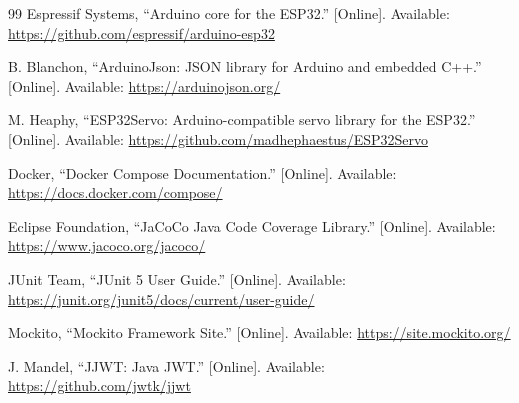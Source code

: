 \begin{thebibliography}{99}
Espressif Systems, ``Arduino core for the ESP32.'' [Online]. Available:
\url{https://github.com/espressif/arduino-esp32}

B. Blanchon, ``ArduinoJson: JSON library for Arduino and embedded C++.'' [Online].
Available: \url{https://arduinojson.org/}

M. Heaphy, ``ESP32Servo: Arduino-compatible servo library for the ESP32.''
[Online]. Available: \url{https://github.com/madhephaestus/ESP32Servo}

Docker, ``Docker Compose Documentation.'' [Online]. Available:
\url{https://docs.docker.com/compose/}

Eclipse Foundation, ``JaCoCo Java Code Coverage Library.'' [Online]. Available:
\url{https://www.jacoco.org/jacoco/}

JUnit Team, ``JUnit 5 User Guide.'' [Online]. Available:
\url{https://junit.org/junit5/docs/current/user-guide/}

Mockito, ``Mockito Framework Site.'' [Online]. Available:
\url{https://site.mockito.org/}

J. Mandel, ``JJWT: Java JWT.'' [Online]. Available:
\url{https://github.com/jwtk/jjwt}

\end{thebibliography}
